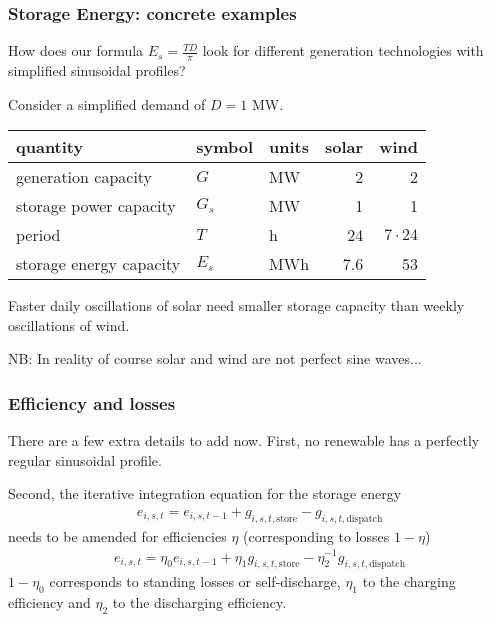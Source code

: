 \documentclass[10pt,dvipsnames]{beamer}
\newcommand{\ra}[1]{\renewcommand{\arraystretch}{#1}}
\begin{document}
\begin{frame}
  \frametitle{Storage Energy: concrete examples}

  How does our formula $E_s = \frac{TD}{\pi}$ look for different
  generation technologies with simplified sinusoidal profiles?

  Consider a simplified demand of $D = 1$ MW.
  \ra{1.05}
  \begin{table}[!t]
    \begin{tabular}{lllrr}
      \toprule
      quantity & symbol & units & solar & wind\\
      \midrule
      generation capacity &$G$ & MW & 2 & 2 \\
      storage power capacity & $G_s$ & MW & 1 & 1 \\
      period & $T$ & h & 24 & $7 \cdot 24$\\
      storage energy capacity & $E_s$ & MWh & 7.6 &  53 \\
      \bottomrule
    \end{tabular}
  \end{table}
  Faster daily oscillations of solar need smaller storage capacity than weekly oscillations of wind.

  NB: In reality of course solar and wind are not perfect sine waves...
\end{frame}

\begin{frame}
  \frametitle{Efficiency and losses}

  There are a few extra details to add now. First, no renewable has a perfectly regular sinusoidal profile.

  Second, the iterative integration equation for the storage energy
  \begin{align*}
    e_{i,s,t} = e_{i,s,t-1} + g_{i,s,t,\textrm{store}} -  g_{i,s,t,\textrm{dispatch}}
  \end{align*}
  needs to be amended for \alert{efficiencies} $\eta$ (corresponding to \alert{losses} $1-\eta$)
  \begin{align*}
    e_{i,s,t} = \eta_0e_{i,s,t-1} + \eta_1g_{i,s,t,\textrm{store}} -  \eta_2^{-1} g_{i,s,t,\textrm{dispatch}}
  \end{align*}
  $1-\eta_0$ corresponds to \alert{standing losses} or \alert{self-discharge}, $\eta_1$ to the \alert{charging efficiency} and $\eta_2$ to the \alert{discharging efficiency}.

\end{frame}
\end{document}
